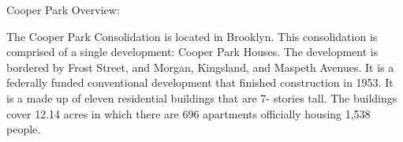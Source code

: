 Cooper Park Overview:        

      

The Cooper Park Consolidation is located in Brooklyn. This consolidation is comprised of a single development: Cooper Park Houses. The development is bordered by Frost Street, and Morgan, Kingsland, and Maspeth Avenues. It is a federally funded conventional development that finished construction in 1953. It is a made up of eleven residential buildings that are 7- stories tall. The buildings cover 12.14 acres in which there are 696 apartments officially housing 1,538 people.
